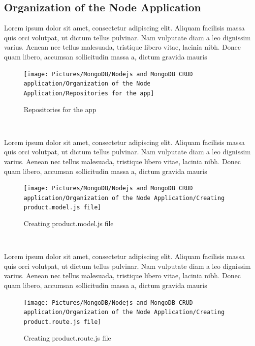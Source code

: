 \begin{spacing}{1.2}
\section{Organization of the Node Application }
\par Lorem ipsum dolor sit amet, consectetur adipiscing elit. Aliquam facilisis massa quis orci volutpat, ut dictum tellus pulvinar. Nam vulputate diam a leo dignissim varius. Aenean nec tellus malesuada, tristique libero vitae, lacinia nibh. Donec quam libero, accumsan sollicitudin massa a, dictum gravida mauris
\\
\begin{figure}[!htb] 
\begin{center} 
\texttt{[image: Pictures/MongoDB/Nodejs and MongoDB CRUD  application/Organization of the Node Application/Repositories for the app]} 
\end{center} 
\caption{Repositories for the app} 
\end{figure}  \FloatBarrier
\\

\par Lorem ipsum dolor sit amet, consectetur adipiscing elit. Aliquam facilisis massa quis orci volutpat, ut dictum tellus pulvinar. Nam vulputate diam a leo dignissim varius. Aenean nec tellus malesuada, tristique libero vitae, lacinia nibh. Donec quam libero, accumsan sollicitudin massa a, dictum gravida mauris
\\
\begin{figure}[!htb] 
\begin{center} 
\texttt{[image: Pictures/MongoDB/Nodejs and MongoDB CRUD  application/Organization of the Node Application/Creating product.model.js file]} 
\end{center} 
\caption{Creating product.model.js file} 
\end{figure}  \FloatBarrier
\\

\par Lorem ipsum dolor sit amet, consectetur adipiscing elit. Aliquam facilisis massa quis orci volutpat, ut dictum tellus pulvinar. Nam vulputate diam a leo dignissim varius. Aenean nec tellus malesuada, tristique libero vitae, lacinia nibh. Donec quam libero, accumsan sollicitudin massa a, dictum gravida mauris
\\
\begin{figure}[!htb] 
\begin{center} 
\texttt{[image: Pictures/MongoDB/Nodejs and MongoDB CRUD  application/Organization of the Node Application/Creating product.route.js file]} 
\end{center} 
\caption{Creating product.route.js file} 
\end{figure}  \FloatBarrier
\\


\end{spacing}
